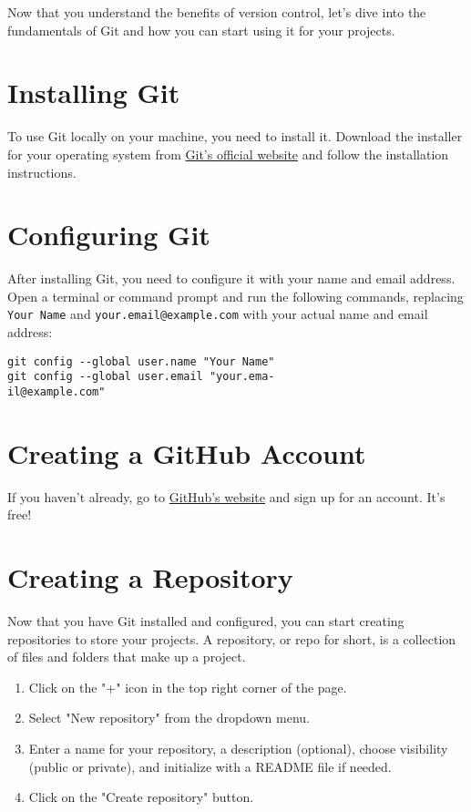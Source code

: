 \documentclass[10pt,twocolumn]{article}
\begin{document}
Now that you understand the benefits of version control, let's dive into the fundamentals of Git and how you can start using it for your projects.

\section{Installing Git}

To use Git locally on your machine, you need to install it. Download the installer for your operating system from \href{https://git-scm.com/downloads}{Git's official website} and follow the installation instructions.

\section{Configuring Git}

After installing Git, you need to configure it with your name and email address. Open a terminal or command prompt and run the following commands, replacing \texttt{Your Name} and \texttt{your.email@example.com} with your actual name and email address:

\begin{verbatim}
git config --global user.name "Your Name"
git config --global user.email "your.ema-
il@example.com"
\end{verbatim}

\section{Creating a GitHub Account}

If you haven't already, go to \href{https://github.com/}{GitHub's website} and sign up for an account. It's free!

\section{Creating a Repository}
\label{sec:paper}

Now that you have Git installed and configured, you can start creating repositories to store your projects. A repository, or repo for short, is a collection of files and folders that make up a project. 

\begin{enumerate}
    \item Click on the "+" icon in the top right corner of the page.
    \item Select "New repository" from the dropdown menu.
    \item Enter a name for your repository, a description (optional), choose visibility (public or private), and initialize with a README file if needed.
    \item Click on the "Create repository" button.
\end{enumerate}
\end{document}
